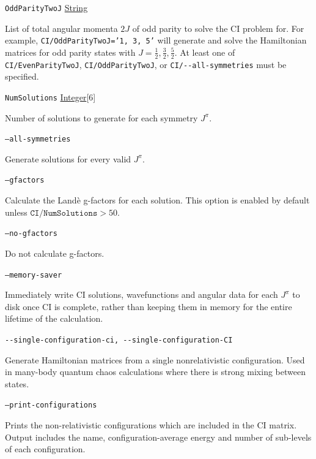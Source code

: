 \documentclass{report}
\begin{document}
\texttt{OddParityTwoJ} \uline{String}
\begin{adjustwidth}{1cm}{}
List of total angular momenta $2J$ of odd parity to solve the CI problem for.
For example, \texttt{CI/OddParityTwoJ='1, 3, 5'} will generate and solve the Hamiltonian matrices for
odd parity states with $J = \frac{1}{2}, \frac{3}{2}, \frac{5}{2}$. At least one of \texttt{CI/EvenParityTwoJ}, 
\texttt{CI/OddParityTwoJ}, or \texttt{CI/{-}{-}all-symmetries} must be specified.
\end{adjustwidth}

\texttt{NumSolutions} \uline{Integer}[6] 
\begin{adjustwidth}{1cm}{}
Number of solutions to generate for each symmetry $J^{\pi}$.
\end{adjustwidth}

\texttt{--all-symmetries} 
\begin{adjustwidth}{1cm}{}
Generate solutions for every valid $J^{\pi}$.
\end{adjustwidth}

\texttt{--gfactors} 
\begin{adjustwidth}{1cm}{}
Calculate the Land\`{e} g-factors for each solution. This option is enabled by default unless 
$\texttt{CI/NumSolutions} > 50$.
\end{adjustwidth}

\texttt{--no-gfactors} 
\begin{adjustwidth}{1cm}{}
Do not calculate g-factors.
\end{adjustwidth}

\texttt{--memory-saver}
\begin{adjustwidth}{1cm}{}
Immediately write CI solutions, wavefunctions and angular data for each $J^{\pi}$ to disk once CI is 
complete, rather than keeping them in memory for the entire lifetime of the calculation. 
\end{adjustwidth}

\texttt{{-}{-}single-configuration-ci, {-}{-}single-configuration-CI}
\begin{adjustwidth}{1cm}{}
Generate Hamiltonian matrices from a single nonrelativistic configuration. Used in many-body quantum
chaos calculations where there is strong mixing between states.
\end{adjustwidth}

\texttt{--print-configurations}
\begin{adjustwidth}{1cm}{}
Prints the non-relativistic configurations which are included in the CI matrix.
Output includes the name, configuration-average energy and number of sub-levels of each configuration.
\end{adjustwidth}
\end{document}
